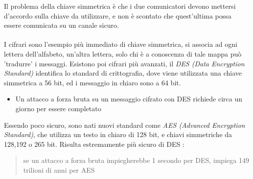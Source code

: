 \documentclass[12pt, letterpaper]{article}
\newcommand{\acc}{\\\hphantom{}\\}
\begin{document}
Il problema della chiave simmetrica è che i due comunicatori devono mettersi d'accordo sulla chiave da utilizzare, e non è 
scontato che quest'ultima possa essere comunicata su un canale sicuro.\acc 
I cifrari sono l'esempio più immediato di chiave simmetrica, si associa ad ogni lettera dell'alfabeto, un'altra lettera, solo chi è 
a conoscenza di tale mappa può 'tradurre' i messaggi. Esistono poi cifrari più avanzati, il
 \textit{DES (Data Encryption Standard)} identifica 
lo standard di crittografia, dove viene utilizzata una chiave simmetrica a 56 bit, ed i messaggio in chiaro sono a 
64 bit.\begin{itemize}
    \item Un attacco a forza bruta su un messaggio cifrato con DES richiede circa un giorno per essere completato 
\end{itemize}
Essendo poco sicuro, sono nati nuovi standard come \textit{AES (Advanced Encryption Standard)}, che utilizza un testo 
in chiaro di 128 bit, e chiavi simmetriche da 128,192 o 265 bit. Risulta estremamente più sicuro di 
DES : \begin{quote}
    se un attacco a forza bruta impiegherebbe 1 secondo per
DES, impiega 149 trilioni di anni per AES
\end{quote}
\end{document}
